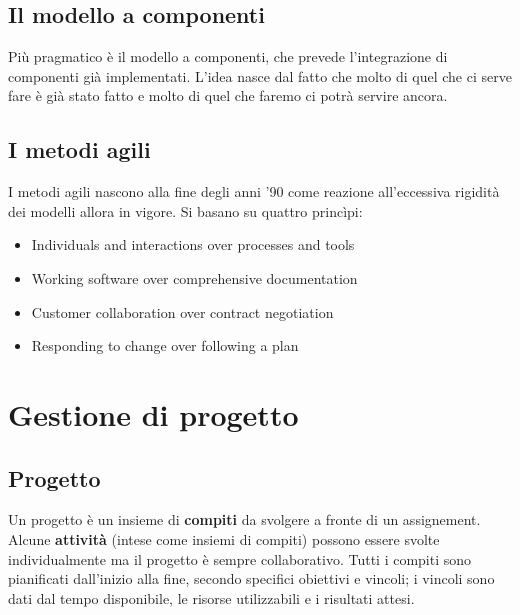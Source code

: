 \documentclass[a4paper]{article}
\begin{document}
		
	\subsection{Il modello a componenti}

		
Più pragmatico è il modello a componenti, che prevede l'integrazione di componenti già implementati. L'idea nasce dal fatto che molto di quel che ci serve fare è già stato fatto e molto di quel che faremo ci potrà servire ancora.

		
	\subsection{I metodi agili}

		
I metodi agili nascono alla fine degli anni '90 come reazione all'eccessiva rigidità dei modelli allora in vigore. Si basano su quattro princìpi:
		
	\begin{itemize}
		
			
	\item Individuals and interactions over processes and tools
			
	\item Working software over comprehensive documentation
			
	\item Customer collaboration over contract negotiation
			
	\item Responding to change over following a plan
		
	\end{itemize}

	


		
	\section{Gestione di progetto}


		
	\subsection{Progetto}

		
Un progetto è un insieme di \textbf{compiti} da svolgere a fronte di un assignement. Alcune \textbf{attività} (intese come insiemi di compiti) possono essere svolte individualmente ma il progetto è sempre collaborativo. Tutti i compiti sono pianificati dall'inizio alla fine, secondo specifici obiettivi e vincoli; i vincoli sono dati dal tempo disponibile, le risorse utilizzabili e i risultati attesi.
\end{document}
